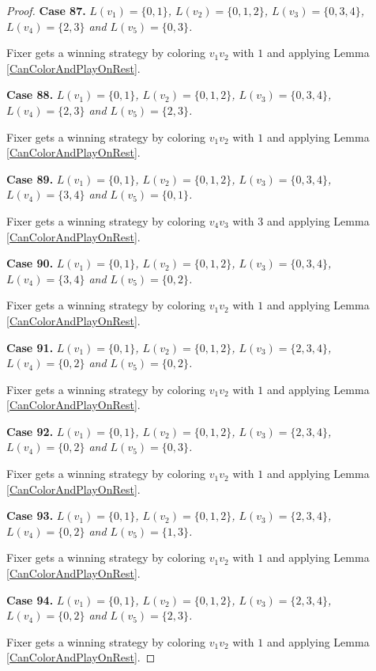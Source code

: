 \documentclass[12pt]{amsart}
\theoremstyle{plain}
\theoremstyle{definition}
\theoremstyle{remark}
\begin{document}
\begin{proof}
\noindent\textbf{Case 87.  }\textit{$L(v_1) = \{0, 1\}$, $L(v_2) = \{0, 1, 2\}$, $L(v_3) = \{0, 3, 4\}$, $L(v_4) = \{2, 3\}$ and $L(v_5) = \{0, 3\}$.}

Fixer gets a winning strategy by coloring $v_1v_2$ with $1$ and applying Lemma \ref{CanColorAndPlayOnRest}.

\noindent\textbf{Case 88.  }\textit{$L(v_1) = \{0, 1\}$, $L(v_2) = \{0, 1, 2\}$, $L(v_3) = \{0, 3, 4\}$, $L(v_4) = \{2, 3\}$ and $L(v_5) = \{2, 3\}$.}

Fixer gets a winning strategy by coloring $v_1v_2$ with $1$ and applying Lemma \ref{CanColorAndPlayOnRest}.

\noindent\textbf{Case 89.  }\textit{$L(v_1) = \{0, 1\}$, $L(v_2) = \{0, 1, 2\}$, $L(v_3) = \{0, 3, 4\}$, $L(v_4) = \{3, 4\}$ and $L(v_5) = \{0, 1\}$.}

Fixer gets a winning strategy by coloring $v_4v_3$ with $3$ and applying Lemma \ref{CanColorAndPlayOnRest}.

\noindent\textbf{Case 90.  }\textit{$L(v_1) = \{0, 1\}$, $L(v_2) = \{0, 1, 2\}$, $L(v_3) = \{0, 3, 4\}$, $L(v_4) = \{3, 4\}$ and $L(v_5) = \{0, 2\}$.}

Fixer gets a winning strategy by coloring $v_1v_2$ with $1$ and applying Lemma \ref{CanColorAndPlayOnRest}.

\noindent\textbf{Case 91.  }\textit{$L(v_1) = \{0, 1\}$, $L(v_2) = \{0, 1, 2\}$, $L(v_3) = \{2, 3, 4\}$, $L(v_4) = \{0, 2\}$ and $L(v_5) = \{0, 2\}$.}

Fixer gets a winning strategy by coloring $v_1v_2$ with $1$ and applying Lemma \ref{CanColorAndPlayOnRest}.

\noindent\textbf{Case 92.  }\textit{$L(v_1) = \{0, 1\}$, $L(v_2) = \{0, 1, 2\}$, $L(v_3) = \{2, 3, 4\}$, $L(v_4) = \{0, 2\}$ and $L(v_5) = \{0, 3\}$.}

Fixer gets a winning strategy by coloring $v_1v_2$ with $1$ and applying Lemma \ref{CanColorAndPlayOnRest}.

\noindent\textbf{Case 93.  }\textit{$L(v_1) = \{0, 1\}$, $L(v_2) = \{0, 1, 2\}$, $L(v_3) = \{2, 3, 4\}$, $L(v_4) = \{0, 2\}$ and $L(v_5) = \{1, 3\}$.}

Fixer gets a winning strategy by coloring $v_1v_2$ with $1$ and applying Lemma \ref{CanColorAndPlayOnRest}.

\noindent\textbf{Case 94.  }\textit{$L(v_1) = \{0, 1\}$, $L(v_2) = \{0, 1, 2\}$, $L(v_3) = \{2, 3, 4\}$, $L(v_4) = \{0, 2\}$ and $L(v_5) = \{2, 3\}$.}

Fixer gets a winning strategy by coloring $v_1v_2$ with $1$ and applying Lemma \ref{CanColorAndPlayOnRest}.


\end{proof}
\end{document}
